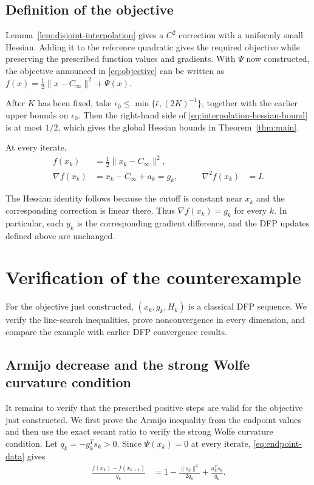 \documentclass[11pt]{article}
\begin{document}
\subsection{Definition of the objective}

Lemma~\ref{lem:disjoint-interpolation} gives a $C^2$ correction with a
uniformly small Hessian.  Adding it to the reference quadratic gives the
required objective while preserving the prescribed function values and
gradients.  With $\Psi$ now constructed, the objective announced in
\eqref{eq:objective} can be written as
$f(x)=\frac12\|x-C_\infty\|^2+\Psi(x)$.

After $K$ has been fixed, take
$\epsilon_0\le\min\{\bar\epsilon,(2K)^{-1}\}$, together with the earlier
upper bounds on $\epsilon_0$.  Then the right-hand side of
\eqref{eq:interpolation-hessian-bound} is at most $1/2$, which gives the global
Hessian bounds in Theorem~\ref{thm:main}.


At every iterate,
\begin{equation}\label{eq:endpoint-data}
\begin{aligned}
f(x_k)&=\frac12\|x_k-C_\infty\|^2,\\
\nabla f(x_k)&=x_k-C_\infty+a_k=g_k,
&\qquad \nabla^2f(x_k)&=I.
\end{aligned}
\end{equation}

The Hessian identity follows because the cutoff is constant near $x_k$ and
the corresponding correction is linear there.  Thus
$\nabla f(x_k)=g_k$ for every $k$.  In particular, each $y_k$ is the
corresponding gradient difference, and the DFP updates defined above are
unchanged.

\section{Verification of the counterexample}
\label{sec:completion}

For the objective just constructed, $(x_k,g_k,H_k)$ is a classical DFP
sequence.  We verify the line-search inequalities, prove nonconvergence in
every dimension, and compare the example with earlier DFP convergence results.


\subsection{Armijo decrease and the strong Wolfe curvature condition}

It remains to verify that the prescribed positive steps are valid for the
objective just constructed.  We first prove the Armijo inequality
from the endpoint values and then use the exact secant ratio to verify the
strong Wolfe curvature condition.  Let $q_k=-g_k^Ts_k>0$.  Since
$\Psi(x_k)=0$ at every iterate,
\eqref{eq:endpoint-data} gives
\begin{align}
\frac{f(x_k)-f(x_{k+1})}{q_k}
&=1-\frac{\|s_k\|^2}{2q_k}
+\frac{a_k^Ts_k}{q_k}.
\label{eq:armijo-ratio}
\end{align}
\end{document}
